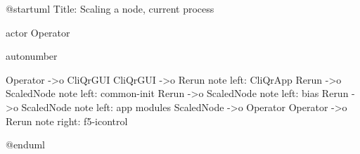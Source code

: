 @startuml
Title: Scaling a node, current process

actor Operator

autonumber

Operator ->o CliQrGUI
CliQrGUI ->o Rerun
note left: CliQrApp
Rerun ->o ScaledNode
note left: common-init
Rerun ->o ScaledNode
note left: bias
Rerun ->o ScaledNode
note left: app modules
ScaledNode ->o Operator
Operator ->o Rerun
note right: f5-icontrol


@enduml
